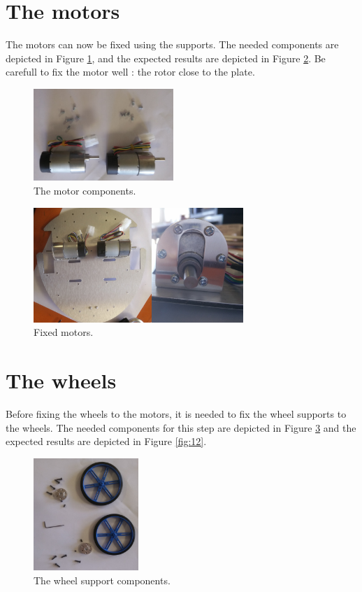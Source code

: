 \documentclass[10pt,a4paper]{report}   %
\begin{document}
\section{The motors}

The motors can now be fixed using the supports. The needed components are depicted in Figure \ref{fig:09}, and the expected results are depicted in Figure \ref{fig:10}. Be carefull to fix the motor well : the rotor close to the plate.

\begin{figure}[H]
\center
\includegraphics[width=200px]{images/09.jpg}
\caption{The motor components.}
\label{fig:09}
\end{figure}


\begin{figure}[H]
\center
\includegraphics[width=300px]{images/10.jpg}
\caption{Fixed motors.}
\label{fig:10}
\end{figure}

\section{The wheels}

Before fixing the wheels to the motors, it is needed to fix the wheel supports to the wheels. The needed components for this step are depicted in Figure \ref{fig:11} and the expected results are depicted in Figure \ref{fig:12}.

\begin{figure}[H]
\center
\includegraphics[width=150px]{images/11.jpg}
\caption{The wheel support components.}
\label{fig:11}
\end{figure}
\end{document}
